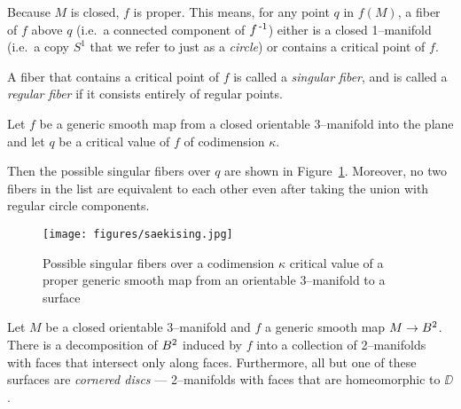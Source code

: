 \begin{defn}
	Because $M$ is closed, $f$ is proper.
	This means, for any point $q$ in $f(M)$, a fiber of $f$ above $q$ (i.e.\ a connected component of $f^{\,\text{-}1}$) either is a closed 1--manifold (i.e.\ a copy $S^1$ that we refer to just as a \emph{circle}) or contains a critical point of $f$.
	
	A fiber that contains a critical point of $f$ is called a \emph{singular fiber}, and is called a \emph{regular fiber} if it consists entirely of regular points.	
\end{defn}

\begin{theorem}
	\label{thm:saekising}
	Let $f$ be a generic smooth map from a closed orientable 3--manifold into the plane and let $q$ be a critical value of $f$ of codimension $\kappa$.
	
	Then the possible singular fibers over $q$ are shown in Figure~\ref{fig:saekising}.
	Moreover, no two fibers in the list are equivalent to each other even after taking the union with regular circle components.
\end{theorem}

	
\begin{figure}
	\centering
	\captionsetup{justification=centering}
	\caption{Possible singular fibers over a codimension $\kappa$ critical value of a proper generic smooth map from an orientable 3--manifold to a surface}
	\texttt{[image: figures/saekising.jpg]}
	\label{fig:saekising}
\end{figure}



%






\begin{lem}
	\label{lem:bbdecomp}
	Let $M$ be a closed orientable 3--manifold and $f$ a generic smooth map $M\to B^2$.
	There is a decomposition of $B^2$ induced by $f$ into a collection of 2--manifolds with faces that intersect only along faces.
	Furthermore, all but one of these surfaces are \emph{cornered discs} --- 2--manifolds with faces that are homeomorphic to $\DD$.
\end{lem}

